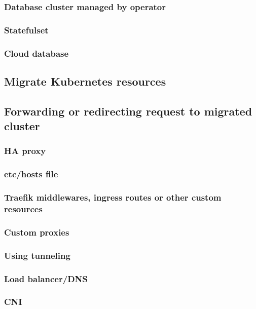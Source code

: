 \subsubsection{Database cluster managed by operator}
\subsubsection{Statefulset}
\subsubsection{Cloud database}

\subsection{Migrate Kubernetes resources}

\subsection{Forwarding or redirecting request to migrated cluster}
\subsubsection{HA proxy}
\subsubsection{etc/hosts file}
\subsubsection{Traefik middlewares, ingress routes or other custom resources}
\subsubsection{Custom proxies}
\subsubsection{Using tunneling}
\subsubsection{Load balancer/DNS}
\subsubsection{CNI}
